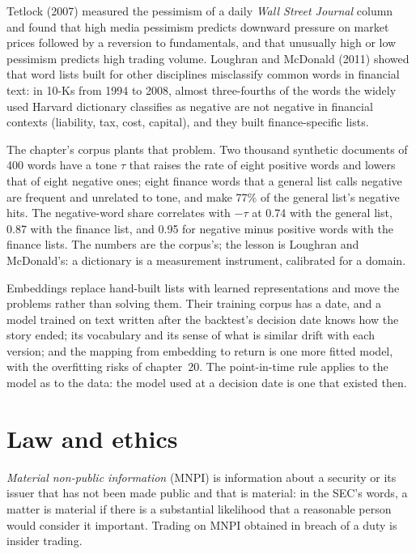 Tetlock (2007) measured the pessimism of a daily \emph{Wall Street Journal} column and found that high media pessimism predicts downward
pressure on market prices followed by a reversion to fundamentals, and that unusually high or low pessimism predicts high trading volume.
Loughran and McDonald (2011) showed that word lists built for other disciplines misclassify common words in financial text: in 10-Ks from
1994 to 2008, almost three-fourths of the words the widely used Harvard dictionary classifies as negative are not negative in financial
contexts (liability, tax, cost, capital), and they built finance-specific lists.

The chapter's corpus plants that problem. Two thousand synthetic documents of 400 words have a tone $\tau$ that raises the rate of eight
positive words and lowers that of eight negative ones; eight finance words that a general list calls negative are frequent and unrelated to
tone, and make 77\% of the general list's negative hits. The negative-word share correlates with $-\tau$ at 0.74 with the general list, 0.87
with the finance list, and 0.95 for negative minus positive words with the finance lists. The numbers are the corpus's; the lesson is Loughran
and McDonald's: a dictionary is a measurement instrument, calibrated for a domain.

Embeddings replace hand-built lists with learned representations and move the problems rather than solving them. Their training corpus has a
date, and a model trained on text written after the backtest's decision date knows how the story ended; its vocabulary and its sense of what
is similar drift with each version; and the mapping from embedding to return is one more fitted model, with the overfitting risks of
chapter~20. The point-in-time rule applies to the model as to the data: the model used at a decision date is one that existed then.

\section{Law and ethics}

\begin{definition}\label{def:rs:alternative-and-text-data:mnpi}
\emph{Material non-public information} (MNPI) is information about a security or its issuer that has
not been made public and that is material: in the SEC's words, a matter is material if there is a substantial likelihood that a reasonable
person would consider it important. Trading on MNPI obtained in breach of a duty is insider trading.
\end{definition}

